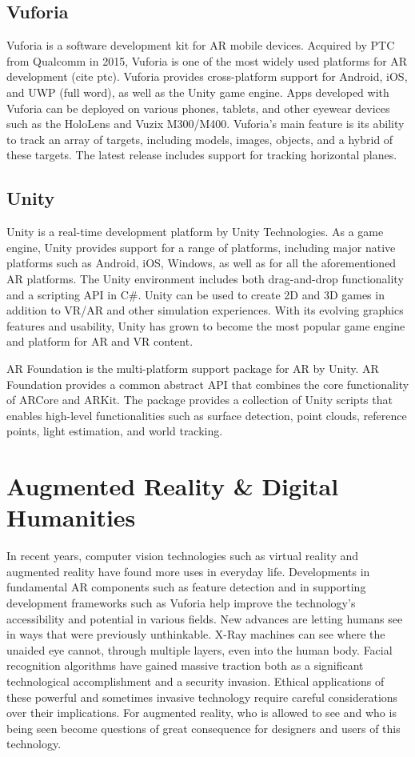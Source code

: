 \subsection{Vuforia}
Vuforia is a software development kit for AR mobile devices. Acquired by PTC from Qualcomm in 2015, Vuforia is one of the most widely used platforms for AR development (cite ptc). Vuforia provides cross-platform support for Android, iOS, and UWP (full word), as well as the Unity game engine. Apps developed with Vuforia can be deployed on various phones, tablets, and other eyewear devices such as the HoloLens and Vuzix M300/M400. Vuforia's main feature is its ability to track an array of targets, including models, images, objects, and a hybrid of these targets. The latest release includes support for tracking horizontal planes.

\subsection{Unity}
Unity is a real-time development platform by Unity Technologies. As a game engine, Unity provides support for a range of platforms, including major native platforms such as Android, iOS, Windows, as well as for all the aforementioned AR platforms. The Unity environment includes both drag-and-drop functionality and a scripting API in C\#. Unity can be used to create 2D and 3D games in addition to VR/AR and other simulation experiences. With its evolving graphics features and usability, Unity has grown to become the most popular game engine and platform for AR and VR content.

AR Foundation is the multi-platform support package for AR by Unity. AR Foundation provides a common abstract API that combines the core functionality of ARCore and ARKit. The package provides a collection of Unity scripts that enables high-level functionalities such as surface detection, point clouds, reference points, light estimation, and world tracking.

\section{Augmented Reality \& Digital Humanities}\label{dighuman}
In recent years, computer vision technologies such as virtual reality and augmented reality have found more uses in everyday life. Developments in fundamental AR components such as feature detection and in supporting development frameworks such as Vuforia help improve the technology's accessibility and potential in various fields. New advances are letting humans see in ways that were previously unthinkable. X-Ray machines can see where the unaided eye cannot, through multiple layers, even into the human body. Facial recognition algorithms have gained massive traction both as a significant technological accomplishment and a security invasion. Ethical applications of these powerful and sometimes invasive technology require careful considerations over their implications. For augmented reality, who is allowed to see and who is being seen become questions of great consequence for designers and users of this technology.

